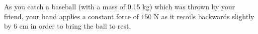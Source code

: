 \question As you catch a baseball (with a mass of 0.15 kg) which was thrown by your friend, your hand applies a constant force of $150$ N as it recoils backwards slightly by 6 cm in order to bring the ball to rest.
